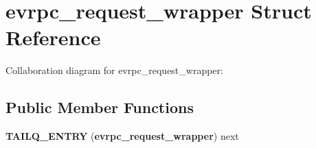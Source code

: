 \section{evrpc\-\_\-request\-\_\-wrapper \-Struct \-Reference}
\label{structevrpc__request__wrapper}


\-Collaboration diagram for evrpc\-\_\-request\-\_\-wrapper\-:
\subsection*{\-Public \-Member \-Functions}
\begin{DoxyCompactItemize}
\item 
{\bfseries \-T\-A\-I\-L\-Q\-\_\-\-E\-N\-T\-R\-Y} ({\bf evrpc\-\_\-request\-\_\-wrapper}) next\label{structevrpc__request__wrapper_a122191199283f943751bcec392357646}

\end{DoxyCompactItemize}
